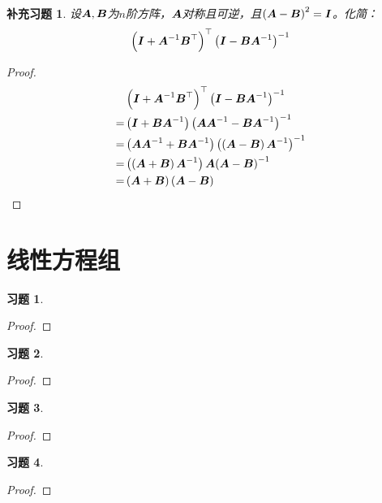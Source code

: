 \documentclass{ctexart}
\newtheorem{problem}{习题}[section]
\newtheorem{suplprob}{补充习题}[section]
\begin{document}
\begin{suplprob}
    设\(\boldsymbol{A},\boldsymbol{B}\)为\(n\)阶方阵，\(\boldsymbol{A}\)对称且可逆，且\(\left( \boldsymbol{A}-\boldsymbol{B} \right)^2=\boldsymbol{I}\)。化简：
    \begin{equation*}
        \left( \boldsymbol{I}+{\boldsymbol{A}}^{-1}\boldsymbol{B}^\top \right)^\top{\left( \boldsymbol{I}-\boldsymbol{B}{\boldsymbol{A}}^{-1} \right)}^{-1}
    \end{equation*}
\end{suplprob}
\begin{proof}
    \begin{align*}
          & \left( \boldsymbol{I}+{\boldsymbol{A}}^{-1}\boldsymbol{B}^\top \right)^\top{\left( \boldsymbol{I}-\boldsymbol{B}{\boldsymbol{A}}^{-1} \right)}^{-1}          \\
        = & \left( \boldsymbol{I}+\boldsymbol{B}{\boldsymbol{A}}^{-1} \right){\left( \boldsymbol{A}{\boldsymbol{A}}^{-1}-\boldsymbol{B}{\boldsymbol{A}}^{-1} \right)}^{-1}         \\
        = & \left( \boldsymbol{A}{\boldsymbol{A}}^{-1}+\boldsymbol{B}{\boldsymbol{A}}^{-1} \right){\left( \left( \boldsymbol{A}-\boldsymbol{B} \right){\boldsymbol{A}}^{-1} \right)}^{-1} \\
        = & \left( \left( \boldsymbol{A}+\boldsymbol{B} \right){\boldsymbol{A}}^{-1} \right)\boldsymbol{A}{\left( \boldsymbol{A}-\boldsymbol{B} \right)}^{-1}                  \\
        = & \left( \boldsymbol{A}+\boldsymbol{B} \right)\left( \boldsymbol{A}-\boldsymbol{B} \right)
    \end{align*}
\end{proof}

\clearpage
\section{线性方程组}

\setcounter{problem}{3}
\begin{problem}
\end{problem}
\begin{proof}

\end{proof}

\begin{problem}
\end{problem}
\begin{proof}

\end{proof}

\begin{problem}
\end{problem}
\begin{proof}

\end{proof}

\begin{problem}
\end{problem}
\begin{proof}

\end{proof}
\end{document}
